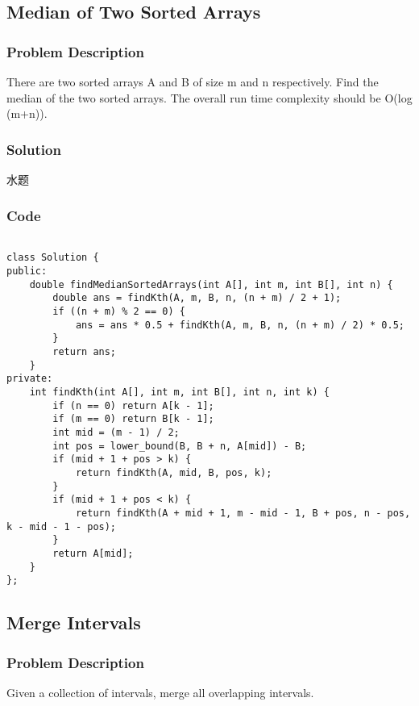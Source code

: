 \documentclass[courier]{article}
\begin{document}
\begin{CJK*}{UTF8}{gkai}
\subsection{ Median of Two Sorted Arrays }

\subsubsection*{Problem Description}
There are two sorted arrays A and B of size m and n respectively. Find the median of the two sorted arrays. The overall run time complexity should be O(log (m+n)).



\subsubsection*{Solution}
水题

\subsubsection*{Code}
\begin{lstlisting}

class Solution {
public:
    double findMedianSortedArrays(int A[], int m, int B[], int n) {
        double ans = findKth(A, m, B, n, (n + m) / 2 + 1);
        if ((n + m) % 2 == 0) {
            ans = ans * 0.5 + findKth(A, m, B, n, (n + m) / 2) * 0.5;
        }
        return ans;
    }
private:
    int findKth(int A[], int m, int B[], int n, int k) {
        if (n == 0) return A[k - 1];
        if (m == 0) return B[k - 1];
        int mid = (m - 1) / 2;
        int pos = lower_bound(B, B + n, A[mid]) - B;
        if (mid + 1 + pos > k) {
            return findKth(A, mid, B, pos, k);
        }
        if (mid + 1 + pos < k) {
            return findKth(A + mid + 1, m - mid - 1, B + pos, n - pos, k - mid - 1 - pos);
        }
        return A[mid];
    }
};

\end{lstlisting}


\subsection{ Merge Intervals }

\subsubsection*{Problem Description}
Given a collection of intervals, merge all overlapping intervals.


\end{CJK*}
\end{document}
